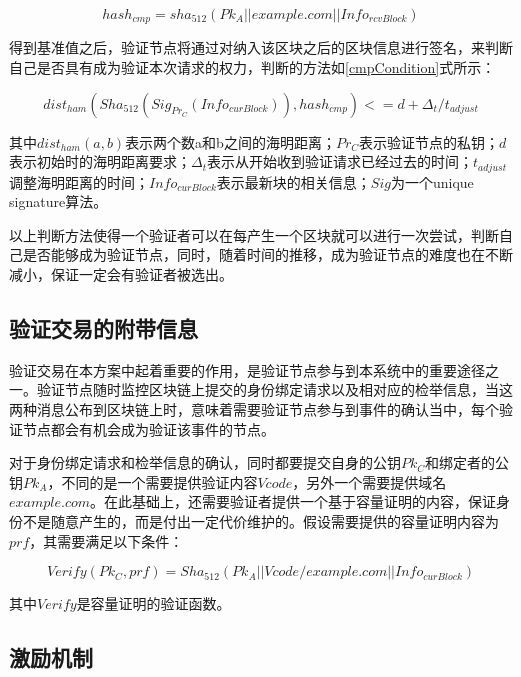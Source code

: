 \begin{equation}\label{eqGenCmpPk}
hash_{cmp} = sha_{512}(Pk_A||example.com||Info_{rcvBlock})
\end{equation}

得到基准值之后，验证节点将通过对纳入该区块之后的区块信息进行签名，来判断自己是否具有成为验证本次请求的权力，判断的方法如\ref{cmpCondition}式所示：


\begin{equation}\label{cmpCondition}
dist_{ham}(Sha_{512}(Sig_{Pr_C}(Info_{curBlock})), hash_{cmp}) <= d + \Delta_t / t_{adjust}
\end{equation}

其中$dist_{ham}(a,b)$表示两个数a和b之间的海明距离；$Pr_C$表示验证节点的私钥；$d$表示初始时的海明距离要求；$\Delta_t$表示从开始收到验证请求已经过去的时间；$t_{adjust}$调整海明距离的时间；$Info_{curBlock}$表示最新块的相关信息；$Sig$为一个unique signature算法。

以上判断方法使得一个验证者可以在每产生一个区块就可以进行一次尝试，判断自己是否能够成为验证节点，同时，随着时间的推移，成为验证节点的难度也在不断减小，保证一定会有验证者被选出。






\subsection{验证交易的附带信息}

验证交易在本方案中起着重要的作用，是验证节点参与到本系统中的重要途径之一。验证节点随时监控区块链上提交的身份绑定请求以及相对应的检举信息，当这两种消息公布到区块链上时，意味着需要验证节点参与到事件的确认当中，每个验证节点都会有机会成为验证该事件的节点。

对于身份绑定请求和检举信息的确认，同时都要提交自身的公钥$Pk_C$和绑定者的公钥$Pk_A$，不同的是一个需要提供验证内容$Vcode$，另外一个需要提供域名$example.com$。在此基础上，还需要验证者提供一个基于容量证明的内容，保证身份不是随意产生的，而是付出一定代价维护的。假设需要提供的容量证明内容为$prf$，其需要满足以下条件：

\begin{equation}\label{pocVerify}
Verify(Pk_C, prf) = Sha_{512}(Pk_A||Vcode/example.com||Info_{curBlock})
\end{equation}

其中$Verify$是容量证明的验证函数。



\subsection{激励机制}

